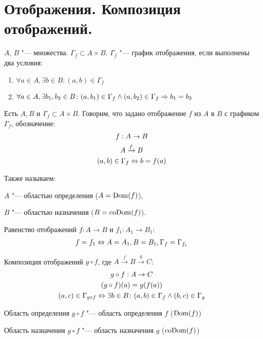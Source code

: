 ﻿\section{Отображения. Композиция отображений.}

\begin{Def}
$A$, $B$ "--- множества. $\Gamma_{f} \subset A \times B$. $\Gamma_f$ "--- график отображения, если выполнены два условия:

\begin{enumerate}
\item $\forall a \in A, \exists b \in B \colon (a, b) \in \Gamma_{f}$
\item $\forall a \in A, \exists b_1, b_2 \in B\colon (a, b_1) \in \Gamma_f \wedge (a, b_2) \in \Gamma_f \Rightarrow b_1 = b_2$
\end{enumerate} 
\end{Def}

\begin{Def}
Есть $A, B$ и $\Gamma_f \subset A \times B$.
Говорим, что задано отображение $f$ из $A$ в $B$ с графиком $\Gamma_f$, обозначение:
\begin{gather*}
f:A \to B \\
A \xrightarrow{f} B \\
(a, b) \in \Gamma_f \Leftrightarrow b = f(a)
\end{gather*}

Также называем:

$A$ "--- областью определения ($A=\operatorname{Dom}(f)$),

$B$ "--- областью назначения ($B=\operatorname{coDom}(f)$).
\end{Def}

\begin{Def}
Равенство отображений $f: A \to B$ и $f_1: A_1 \to B_1$:
\begin{gather*}
f = f_1 \Leftrightarrow A = A_1, B = B_1, \Gamma_f = \Gamma_{f_1}
\end{gather*}
\end{Def}

\begin{Def}
Композиция отображений $g \circ f$, где $A \xrightarrow{f} B \xrightarrow{g} C$:
\begin{gather*}
g \circ f: A \to C \\
(g \circ f)(a) = g(f(a)) \\
(a, c) \in \Gamma_{g \circ f} \Leftrightarrow \exists b \in B \colon (a, b) \in \Gamma_{f} \wedge (b, c) \in \Gamma_g
\end{gather*}

Область определения $g \circ f$ "--- область определения $f$ ($\operatorname{Dom}(f)$)

Область назначения $g \circ f$ "--- область назначения $g$ ($\operatorname{coDom}(f)$)

\end{Def}

